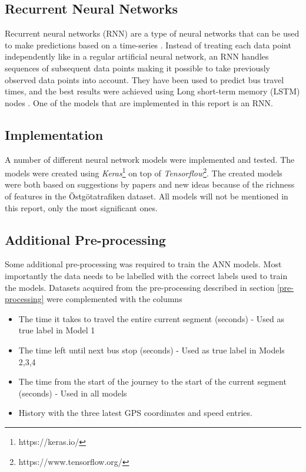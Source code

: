 \subsection{Recurrent Neural Networks}
Recurrent neural networks (RNN) are a type of neural networks that can be used to make predictions based on a time-series \cite{RNN}. Instead of treating each data point independently like in a regular artificial neural network, an RNN handles sequences of subsequent data points making it possible to take previously observed data points into account. They have been used to predict bus travel times, and the best results were achieved using Long short-term memory (LSTM) nodes \cite{RNNBusPredictions}. One of the models that are implemented in this report is an RNN. 


\subsection{Implementation}
A number of different neural network models were implemented and tested. The models were created using \textit{Keras}\footnote{https://keras.io/} on top of \textit{Tensorflow}\footnote{https://www.tensorflow.org/}. The created models were both based on suggestions by papers \cite{brazilANN,RNNBusPredictions} and new ideas because of the richness of features in the Östgötatrafiken dataset. All models will not be mentioned in this report, only the most significant ones.

\subsection{Additional Pre-processing}
Some additional pre-processing was required to train the ANN models. Most importantly the data needs to be labelled with the correct labels used to train the models. Datasets acquired from the pre-processing described in section \ref{pre-processing} were complemented with the columns

\begin{itemize}
    \item The time it takes to travel the entire current segment (seconds) - Used as true label in Model 1
    \item The time left until next bus stop (seconds) - Used as true label in Models 2,3,4
    \item The time from the start of the journey to the start of the current segment (seconds) - Used in all models
    \item History with the three latest GPS coordinates and speed entries.
\end{itemize}

